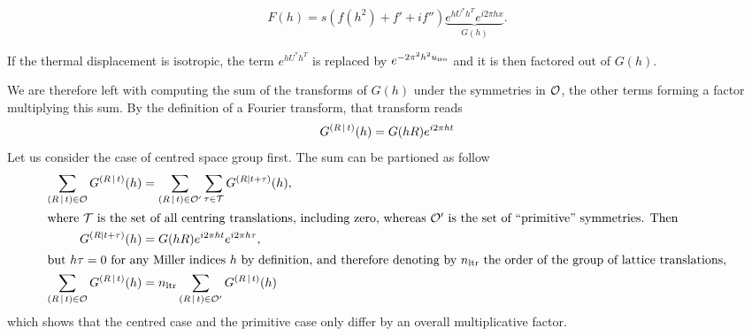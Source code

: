 \documentclass{iucr}
\begin{document}
\begin{equation}
F(h) = s (f(h^2) + f' + i f'') \underbrace{e^{h U^* h^T} e^{i 2\pi h x}}_{G(h)}.
\end{equation}

If the thermal displacement is isotropic, the term $e^{h U^* h^T}$ is replaced by $e^{-2\pi^2 h^2 u_{\text{iso}}}$ and it is then factored out of $G(h)$.

We are therefore left with computing the sum of the transforms of $G(h)$ under the symmetries in $\cal{O}$, the other terms forming a factor multiplying this sum. By the definition of a Fourier transform, that transform reads
\begin{equation}
G^{\left( R\,\vert\, t \right)}(h) = G(hR)e^{i 2\pi ht}
\label{eqn:transformofG}
\end{equation}
Let us consider the case of centred space group first. The sum can be partioned as follow
\begin{align}
 \sum_{\left( R\,\vert\, t \right) \in \cal{O}} G^{\left( R\,\vert\, t \right)}(h) &=  \sum_{\left( R\,\vert\, t \right) \in \cal{O'}} \sum_{\tau \in \cal{T}} G^{(R \mid t+\tau)}(h), \nonumber\\
\intertext{where $\cal{T}$ is the set of all centring translations, including zero, whereas $\cal{O'}$ is the set of ``primitive'' symmetries. Then}
G^{(R \mid t + \tau)}(h) &= G(hR) e^{i2\pi ht} e^{i2\pi h\tau}, \nonumber \\
\intertext{but $h\tau=0$ for any Miller indices $h$ by definition, and therefore denoting by $n_{\text{ltr}}$ the order of the group of lattice translations,}
\sum_{\left( R\,\vert\, t \right) \in \cal{O}} G^{\left( R\,\vert\, t \right)}(h) &= n_{\text{ltr}} \sum_{\left( R\,\vert\, t \right) \in \cal{O'}} G^{\left( R\,\vert\, t \right)}(h)
\end{align}
which shows that the centred case and the primitive case only differ by an overall multiplicative factor.
\end{document}
